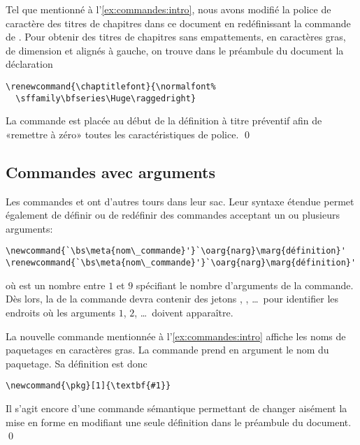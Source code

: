 \begin{exemple}
  Tel que mentionné à l'\autoref{ex:commandes:intro}, nous avons
  modifié la police de caractère des titres de chapitres dans ce
  document en redéfinissant la commande \cmdprint{\chaptitlefont} de
  . Pour obtenir des titres de chapitres sans
  empattements, en caractères gras, de dimension \cmdprint{\Huge} et
  alignés à gauche, on trouve dans le préambule du document la
  déclaration
\begin{lstlisting}
\renewcommand{\chaptitlefont}{\normalfont%
  \sffamily\bfseries\Huge\raggedright}
\end{lstlisting}
  La commande \cmd{\normalfont} est placée au début de la définition à
  titre préventif afin de «remettre à zéro» toutes les
  caractéristiques de police. %
  \qed
\end{exemple}


\subsection{Commandes avec arguments}
\label{sec:commandes:commandes:avec_arg}

Les commandes \cmdprint{\newcommand} et \cmdprint{\renewcommand} ont
d'autres tours dans leur sac. Leur syntaxe étendue permet également de
définir ou de redéfinir des commandes acceptant un ou plusieurs
arguments:
\begin{lstlisting}
\newcommand{`\bs\meta{nom\_commande}'}`\oarg{narg}\marg{définition}'
\renewcommand{`\bs\meta{nom\_commande}'}`\oarg{narg}\marg{définition}'
\end{lstlisting}
où  est un nombre entre $1$ et $9$ spécifiant le nombre
d'arguments de la commande. Dès lors, la  de la
commande devra contenir des jetons , ,
\dots\ pour identifier les endroits où les arguments $1$, $2$, \dots\
doivent apparaître.

\begin{exemple}
  La nouvelle commande \cmdprint{\pkg} mentionnée à
  l'\autoref{ex:commandes:intro} affiche les noms de paquetages en
  caractères gras. La commande prend en argument le nom du paquetage.
  Sa définition est donc
\begin{lstlisting}
\newcommand{\pkg}[1]{\textbf{#1}}
\end{lstlisting}
  Il s'agit encore d'une commande sémantique permettant de changer
  aisément la mise en forme en modifiant une seule définition dans le
  préambule du document. %
  \qed
\end{exemple}

